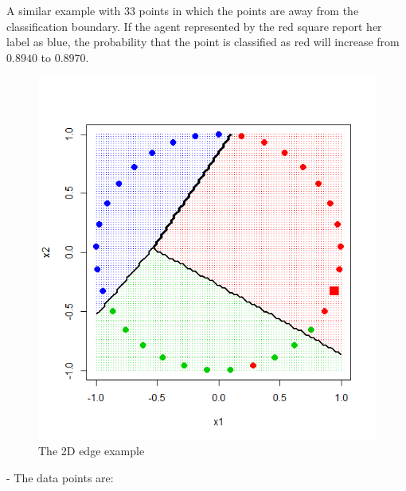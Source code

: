 \documentclass{article}
\begin{document}
A similar example with $33$ points in which the points are away from the classification boundary. If the agent represented by the red square report her label as blue, the probability that the point is classified as red will increase from $0.8940$ to $0.8970$.
\begin{figure}[H]
\centering
\includegraphics[width=0.5\linewidth]{test_33_15}
\caption{The 2D edge example}
\end{figure}
 -
\newline \newline
The data points are:
\end{document}
